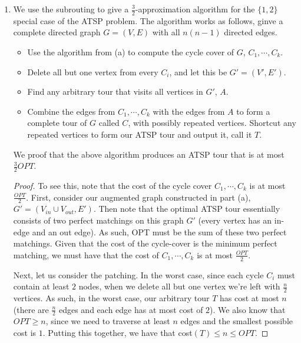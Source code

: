 \documentclass[12pt]{exam}
\begin{document}
\begin{questions}
\begin{solution}
\begin{enumerate}[label=(\alph*)]
\begin{proof}
      For the other direction, suppose we have a cycle cover $C$. By our arguments above, this means that we have a set of edges $(u,v) \in M$ such that each node has exactly one incoming edge and one outgoing edge. Then the edges $(u_{out}, v_{in})$ correspond exactly to a perfect matching in $H$.
    \end{proof}

    From the above, we conclude that solving the minimum perfect matching problem in $H'$ will yield the corresponding cycle cover with minimum total cost.


    \item
      We use the subrouting to give a $\frac{3}{2}$-approximation algorithm for the $\{1,2\}$ special case of the ATSP problem. The algorithm works as follows, ginve a complete directed graph $G = (V,E)$ with all $n(n-1)$ directed edges.

      \begin{itemize}
        \item Use the algorithm from (a) to compute the cycle cover of $G$, $C_1, \cdots, C_k$.
        \item Delete all but one vertex from every $C_i$, and let this be $G' = (V', E')$.
        \item Find any arbitrary tour that visits all vertices in $G'$, $A$.
        \item Combine the edges from $C_1, \cdots, C_k$ with the edges from $A$ to form a complete tour of $G$ called $C$, with possibly repeated vertices. Shortcut any repeated vertices to form our ATSP tour and output it, call it $T$.
      \end{itemize}

      We proof that the above algorithm produces an ATSP tour that is at most $\frac{3}{2}OPT$. 
      \begin{proof}
        To see this, note that the cost of the cycle cover $C_1, \cdots, C_k$ is at most $\frac{OPT}{2}$. First, consider our augmented graph constructed in part (a), $G' = (V_{in} \cup V_{out}, E')$. Then note that the optimal ATSP tour essentially consists of two perfect matchings on this graph $G'$ (every vertex has an in-edge and an out edge). As such, OPT must be the sum of these two perfect matchings. Given that the cost of the cycle-cover is the minimum perfect matching, we must have that the cost of $C_1, \cdots, C_k$ is at most $\frac{OPT}{2}$. 

        Next, let us consider the patching. In the worst case, since each cycle $C_i$ must contain at least $2$ nodes, when we delete all but one vertex we're left with $\frac{n}{2}$ vertices. As such, in the worst case, our arbitrary tour $T$ has cost at most $n$ (there are $\frac{n}{2}$ edges and each edge has at most cost of $2$). We also know that $OPT \geq n$, since we need to traverse at least $n$ edges and the smallest possible cost is $1$. Putting this together, we have that cost$(T) \leq n \leq OPT$.


\end{proof}
\end{enumerate}
\end{solution}
\end{questions}
\end{document}
